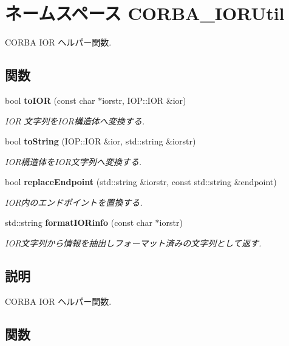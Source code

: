 \section{ネームスペース CORBA\_\-IORUtil}
\label{namespaceCORBA__IORUtil}


CORBA IOR ヘルパー関数.  


\subsection*{関数}
\begin{DoxyCompactItemize}
\item 
bool {\bf toIOR} (const char $\ast$iorstr, IOP::IOR \&ior)
\begin{DoxyCompactList}\small\item\em IOR 文字列をIOR構造体へ変換する. \item\end{DoxyCompactList}\item 
bool {\bf toString} (IOP::IOR \&ior, std::string \&iorstr)
\begin{DoxyCompactList}\small\item\em IOR構造体をIOR文字列へ変換する. \item\end{DoxyCompactList}\item 
bool {\bf replaceEndpoint} (std::string \&iorstr, const std::string \&endpoint)
\begin{DoxyCompactList}\small\item\em IOR内のエンドポイントを置換する. \item\end{DoxyCompactList}\item 
std::string {\bf formatIORinfo} (const char $\ast$iorstr)
\begin{DoxyCompactList}\small\item\em IOR文字列から情報を抽出しフォーマット済みの文字列として返す. \item\end{DoxyCompactList}\end{DoxyCompactItemize}


\subsection{説明}
CORBA IOR ヘルパー関数. 

\subsection{関数}
